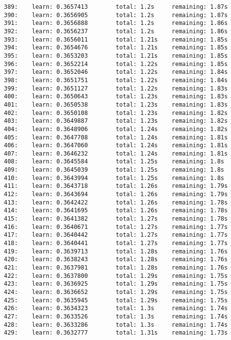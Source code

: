 \documentclass[11pt]{article}
\begin{document}
\begin{Verbatim}[commandchars=\\\{\}]
389:    learn: 0.3657413        total: 1.2s     remaining: 1.87s
390:    learn: 0.3656905        total: 1.2s     remaining: 1.87s
391:    learn: 0.3656888        total: 1.2s     remaining: 1.86s
392:    learn: 0.3656237        total: 1.2s     remaining: 1.86s
393:    learn: 0.3656011        total: 1.21s    remaining: 1.85s
394:    learn: 0.3654676        total: 1.21s    remaining: 1.85s
395:    learn: 0.3653203        total: 1.21s    remaining: 1.85s
396:    learn: 0.3652214        total: 1.22s    remaining: 1.85s
397:    learn: 0.3652046        total: 1.22s    remaining: 1.84s
398:    learn: 0.3651751        total: 1.22s    remaining: 1.84s
399:    learn: 0.3651127        total: 1.22s    remaining: 1.83s
400:    learn: 0.3650643        total: 1.23s    remaining: 1.83s
401:    learn: 0.3650538        total: 1.23s    remaining: 1.83s
402:    learn: 0.3650108        total: 1.23s    remaining: 1.82s
403:    learn: 0.3649887        total: 1.23s    remaining: 1.82s
404:    learn: 0.3648906        total: 1.24s    remaining: 1.82s
405:    learn: 0.3647708        total: 1.24s    remaining: 1.81s
406:    learn: 0.3647060        total: 1.24s    remaining: 1.81s
407:    learn: 0.3646232        total: 1.24s    remaining: 1.81s
408:    learn: 0.3645584        total: 1.25s    remaining: 1.8s
409:    learn: 0.3645039        total: 1.25s    remaining: 1.8s
410:    learn: 0.3643994        total: 1.25s    remaining: 1.8s
411:    learn: 0.3643718        total: 1.26s    remaining: 1.79s
412:    learn: 0.3643694        total: 1.26s    remaining: 1.79s
413:    learn: 0.3642422        total: 1.26s    remaining: 1.78s
414:    learn: 0.3641695        total: 1.26s    remaining: 1.78s
415:    learn: 0.3641382        total: 1.27s    remaining: 1.78s
416:    learn: 0.3640671        total: 1.27s    remaining: 1.77s
417:    learn: 0.3640442        total: 1.27s    remaining: 1.77s
418:    learn: 0.3640441        total: 1.27s    remaining: 1.77s
419:    learn: 0.3639713        total: 1.28s    remaining: 1.76s
420:    learn: 0.3638243        total: 1.28s    remaining: 1.76s
421:    learn: 0.3637981        total: 1.28s    remaining: 1.76s
422:    learn: 0.3637800        total: 1.29s    remaining: 1.75s
423:    learn: 0.3636925        total: 1.29s    remaining: 1.75s
424:    learn: 0.3636652        total: 1.29s    remaining: 1.75s
425:    learn: 0.3635945        total: 1.29s    remaining: 1.75s
426:    learn: 0.3634323        total: 1.3s     remaining: 1.74s
427:    learn: 0.3633526        total: 1.3s     remaining: 1.74s
428:    learn: 0.3633286        total: 1.3s     remaining: 1.74s
429:    learn: 0.3632777        total: 1.31s    remaining: 1.73s

\end{Verbatim}
\end{document}
